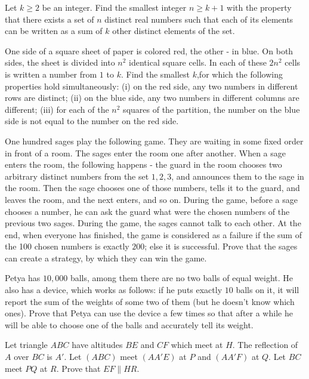 \documentclass[11pt]{scrartcl}
\begin{document}
\begin{problem}[1837105952530316058]
Let $k\ge2$ be an integer. Find the smallest integer $n \ge k+1$ with the property that there exists a set of $n$ distinct real numbers such that each of its elements can be written as a sum of $k$ other distinct elements of the set.
\end{problem}
\begin{problem}[8317584744128058138]
	One side of a square sheet of paper is colored red, the other - in blue. On both sides, the sheet is divided into $n^2$ identical square cells. In each of these $2n^2$ cells is written a number from $1$ to $k$. Find the smallest $k$,for which the following properties hold simultaneously:
(i) on the red side, any two numbers in different rows are distinct;
(ii) on the blue side, any two numbers in different columns are different;
(iii) for each of the $n^2$ squares of the partition, the number on the blue side is not equal to the number on the red side.
\end{problem}
\begin{problem}[2212576839999739806]
	One hundred sages play the following game. They are waiting in some fixed order in front of a room. The sages enter the room one after another. When a sage enters the room, the following happens - the guard in the room chooses two arbitrary distinct numbers from the set {$1,2,3$}, and announces them to the sage in the room. Then the sage chooses one of those numbers, tells it to the guard, and leaves the room, and the next enters, and so on. During the game, before a sage chooses a number, he can ask the guard what were the chosen numbers of the previous two sages. During the game, the sages cannot talk to each other. At the end, when everyone has finished, the game is considered as a failure if the sum of the 100 chosen numbers is exactly $200$; else it is successful. Prove that the sages can create a strategy, by which they can win the game.
\end{problem}
\begin{problem}[561375932085594939]
Petya has $10, 000$ balls, among them there are no two balls of equal weight. He also has a device, which works as follows: if he puts exactly $10$ balls on it, it will report the sum of the weights of some two of them (but he doesn't know which ones). Prove that Petya can use the device a few times so that after a while he will be able to choose one of the balls and accurately tell its weight.
\end{problem}
\begin{problem}[210358073900610]
Let triangle $ABC$ have altitudes $BE$ and $CF$ which meet at $H$. The reflection of $A$ over $BC$ is $A'$. Let $(ABC)$ meet $(AA'E)$ at $P$ and $(AA'F)$ at $Q$. Let $BC$ meet $PQ$ at $R$. Prove that $EF \parallel HR$.
\end{problem}
\end{document}
